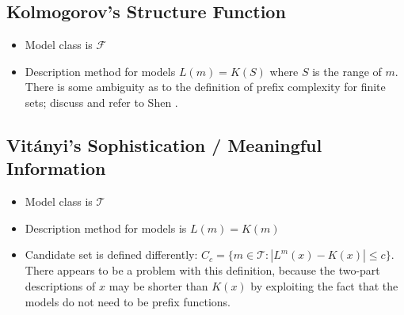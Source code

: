 \documentclass{style/llncs}
\newcommand{\T}{\mathscr T}
\newcommand{\F}{\mathscr F}
\begin{document}
\subsection{Kolmogorov's Structure Function}

\begin{itemize}
\item Model class is $\F$
\item Description method for models $L(m)=K(S)$ where $S$ is the range
  of $m$. There is some ambiguity as to the definition of prefix
  complexity for finite sets; discuss and refer to Shen \cite{TODO}.
\end{itemize}

\subsection{Vit\'anyi's Sophistication / Meaningful Information}

\begin{itemize}
\item Model class is $\T$
\item Description method for models is $L(m)=K(m)$
\item Candidate set is defined differently: $C_c=\{m\in\T:|L^m(x)-K(x)|\le
  c\}$. There appears to be a problem with this definition, because
  the two-part descriptions of $x$ may be shorter than $K(x)$ by
  exploiting the fact that the models do not need to be prefix functions.
\end{itemize}

% 
\end{document}
